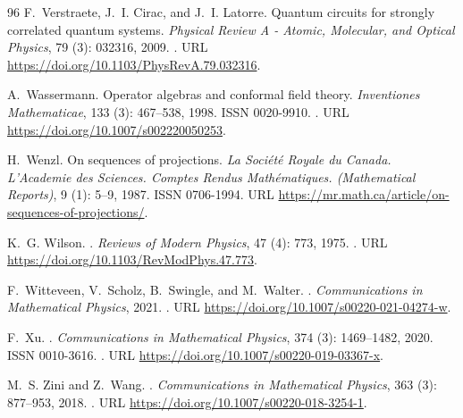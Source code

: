 \documentclass[a4paper, 11pt]{article}
\DeclareMathOperator{\1}{\mathds{1}}
\begin{document}
\begin{thebibliography}{96}
F.~Verstraete, J.~I. Cirac, and J.~I. Latorre.
\newblock Quantum circuits for strongly correlated quantum systems.
\newblock \emph{Physical Review A - Atomic, Molecular, and Optical Physics},
  79 (3): 032316, 2009.
\newblock {}.
\newblock URL \url{https://doi.org/10.1103/PhysRevA.79.032316}.

A.~Wassermann.
\newblock Operator algebras and conformal field theory.
\newblock \emph{Inventiones Mathematicae}, 133 (3): 467--538,
  1998.
\newblock ISSN 0020-9910.
\newblock {}.
\newblock URL \url{https://doi.org/10.1007/s002220050253}.

H.~Wenzl.
\newblock On sequences of projections.
\newblock \emph{La Soci\'{e}t\'{e} Royale du Canada. L'Academie des Sciences.
  Comptes Rendus Math\'{e}matiques. (Mathematical Reports)}, 9
  (1): 5--9, 1987.
\newblock ISSN 0706-1994.
\newblock URL \url{https://mr.math.ca/article/on-sequences-of-projections/}.

K.~G. Wilson.
.
\newblock \emph{Reviews of Modern Physics}, 47 (4): 773,
  1975.
\newblock {}.
\newblock URL \url{https://doi.org/10.1103/RevModPhys.47.773}.

F.~Witteveen, V.~Scholz, B.~Swingle, and M.~Walter.
.
\newblock \emph{Communications in Mathematical Physics}, 2021.
\newblock {}.
\newblock URL \url{https://doi.org/10.1007/s00220-021-04274-w}.

F.~Xu.
.
\newblock \emph{Communications in Mathematical Physics}, 374
  (3): 1469--1482, 2020.
\newblock ISSN 0010-3616.
\newblock {}.
\newblock URL \url{https://doi.org/10.1007/s00220-019-03367-x}.

M.~S. Zini and Z.~Wang.
.
\newblock \emph{Communications in Mathematical Physics}, 363
  (3): 877--953, 2018.
\newblock {}.
\newblock URL \url{https://doi.org/10.1007/s00220-018-3254-1}.

\end{thebibliography}
\end{document}
